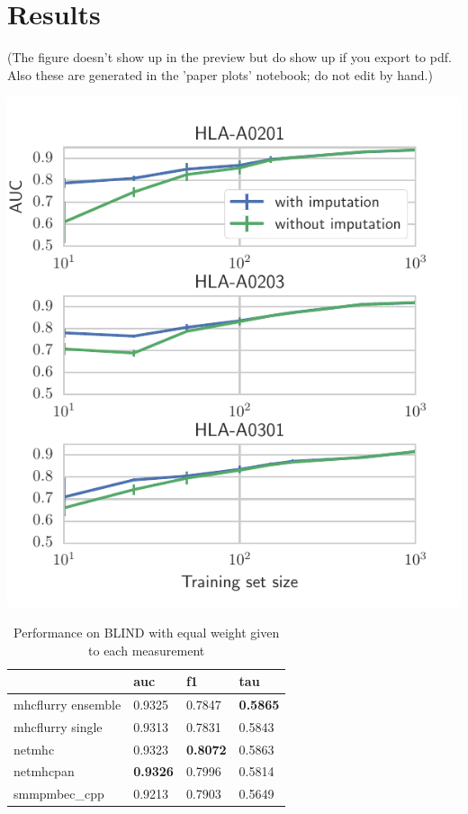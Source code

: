 \section{Results}
(The figure doesn't show up in the preview but do show up if you export to pdf. Also these are generated in the 'paper plots' notebook; do not edit by hand.)

\includegraphics{figures/impute_comparison.pdf}


\begin{table}[h]
\begin{tabular}{llll}
\toprule
{} &              auc &               f1 &              tau \\
\midrule
mhcflurry ensemble &           0.9325 &           0.7847 &  \textbf{0.5865} \\
mhcflurry single   &           0.9313 &           0.7831 &           0.5843 \\
netmhc             &           0.9323 &  \textbf{0.8072} &           0.5863 \\
netmhcpan          &  \textbf{0.9326} &           0.7996 &           0.5814 \\
smmpmbec_cpp       &           0.9213 &           0.7903 &           0.5649 \\
\bottomrule
\end{tabular}

\caption{Performance on BLIND with equal weight given to each measurement}
\end{table}

